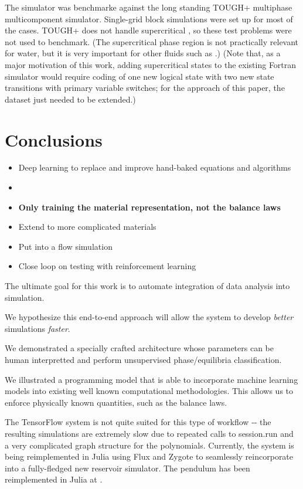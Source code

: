 \documentclass[]{article}
\begin{document}
The simulator was benchmarke against the long standing TOUGH+ multiphase
multicomponent simulator. Single-grid block simulations were set up for most of the cases. TOUGH+
does not handle supercritical , so these test problems were not
used to benchmark. (The supercritical phase region is not practically
relevant for water, but it is very important for other fluids such as
.) (Note that, as a major motivation of this work, adding
supercritical states to the existing Fortran simulator would require
coding of one new logical state with two new state transitions with
primary variable switches; for the approach of this paper, the dataset
just needed to be extended.)


\hypertarget{header-n3421}{%
\section{Conclusions}\label{header-n3421}}

\begin{itemize}
\item
  Deep learning to replace and improve hand-baked equations and
  algorithms
\item
\item
  \textbf{Only training the material representation, not the balance
  laws}
\item
  Extend to more complicated materials
\item
  Put into a flow simulation
\item
  Close loop on testing with reinforcement learning
\end{itemize}

The ultimate goal for this work is to automate integration of data
analysis into simulation.

We hypothesize this end-to-end approach will allow the system to develop
\emph{better} simulations \emph{faster}.

We demonstrated a specially crafted architecture whose parameters can be
human interpretted and perform unsupervised phase/equilibria
classification.

We illustrated a programming model that is able to incorporate machine
learning models into existing well known computational methodologies.
This allows us to enforce physically known quantities, such as the
balance laws.

The TensorFlow system is not quite suited for this type of workflow -\/-
the resulting simulations are extremely slow due to repeated calls to
session.run and a very complicated graph structure for the polynomials.
Currently, the system is being reimplemented in Julia using Flux and
Zygote to seamlessly reincorporate into a fully-fledged new reservoir
simulator. The pendulum has been reimplemented in Julia at .
\end{document}
